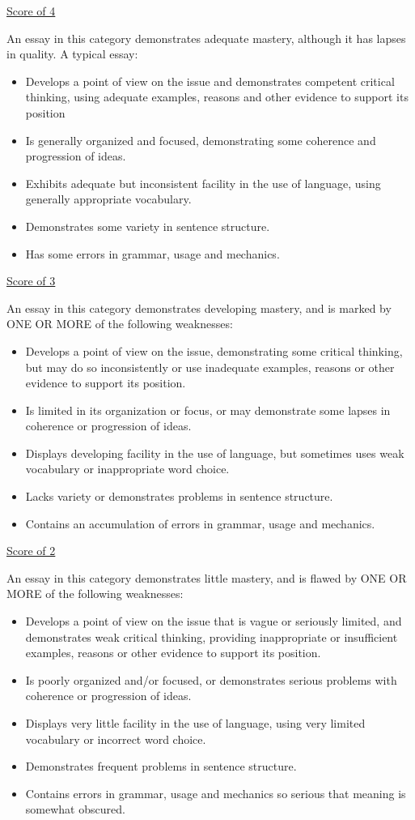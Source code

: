 \documentclass[12pt]{book}
\begin{document}
\vfill
\newpage
\underline{Score of 4}

An essay in this category demonstrates adequate mastery, although it has lapses in quality. A typical essay:
\begin{itemize}
\item{Develops a point of view on the issue and demonstrates competent critical thinking, using adequate examples, reasons and other evidence to support its position}
\item{Is generally organized and focused, demonstrating some coherence and progression of ideas.}
\item{Exhibits adequate but inconsistent facility in the use of language, using generally appropriate vocabulary.}
\item{Demonstrates some variety in sentence structure.}
\item{Has some errors in grammar, usage and mechanics.}
\end{itemize}

\vfill
\underline{Score of 3}

An essay in this category demonstrates developing mastery, and is marked by ONE OR MORE of the following weaknesses:

\begin{itemize}
\item{Develops a point of view on the issue, demonstrating some critical thinking, but may do so inconsistently or use inadequate examples, reasons or other evidence to support its position.}
\item{Is limited in its organization or focus, or may demonstrate some lapses in coherence or progression of ideas.}
\item{Displays developing facility in the use of language, but sometimes uses weak vocabulary or inappropriate word choice.}
\item{Lacks variety or demonstrates problems in sentence structure.}
\item{Contains an accumulation of errors in grammar, usage and mechanics.}
\end{itemize}

\vfill
\underline{Score of 2}

An essay in this category demonstrates little mastery, and is flawed by ONE OR MORE of the following weaknesses:

\begin{itemize}
\item{Develops a point of view on the issue that is vague or seriously limited, and demonstrates weak critical thinking, providing inappropriate or insufficient examples, reasons or other evidence to support its position.}
\item{Is poorly organized and/or focused, or demonstrates serious problems with coherence or progression of ideas.}
\item{Displays very little facility in the use of language, using very limited vocabulary or incorrect word choice.}
\item{Demonstrates frequent problems in sentence structure.}
\item{Contains errors in grammar, usage and mechanics so serious that meaning is somewhat obscured.}
\end{itemize}
\end{document}
